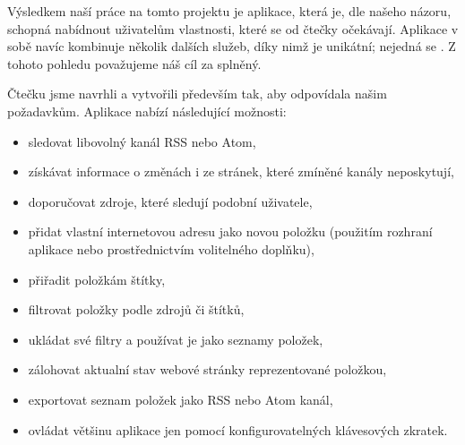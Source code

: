 
Výsledkem naší práce na tomto projektu je aplikace, která je, dle našeho názoru, schopná nabídnout uživatelům vlastnosti, které se od čtečky očekávají.
Aplikace v sobě navíc kombinuje několik dalších služeb, díky nimž je unikátní; nejedná se .
Z tohoto pohledu považujeme náš cíl za splněný.

Čtečku jsme navrhli a vytvořili především tak, aby odpovídala našim požadavkům.
Aplikace nabízí následující možnosti:
\begin{itemize}
	\item sledovat libovolný kanál RSS nebo Atom,
	\item získávat informace o změnách i ze stránek, které zmíněné kanály neposkytují,
	\item doporučovat zdroje, které sledují podobní uživatele,
	\item přidat vlastní internetovou adresu jako novou položku (použitím rozhraní aplikace nebo prostřednictvím volitelného doplňku),
	\item přiřadit položkám štítky,
	\item filtrovat položky podle zdrojů či štítků,
	\item ukládat své filtry a používat je jako seznamy položek,
	\item zálohovat aktualní stav webové stránky reprezentované položkou,
	\item exportovat seznam položek jako RSS nebo Atom kanál,
	\item ovládat většinu aplikace jen pomocí konfigurovatelných klávesových zkratek.
\end{itemize}

